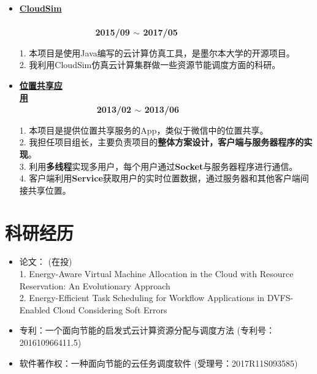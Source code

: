 \documentclass[letterpaper, UTF8, 11pt]{article}
\begin{document}
\begin{itemize}
		
		\item \textbf{\href{https://github.com/Hepsilion/cloudsim}{CloudSim}}  ~~~~~~~~~~~~~~~~~~~~~~~~~~~~~~~~~~~~~~~~~~~~~~~~~~~~~~~~~~~~~~~~~~~~~~~~~~~~~~~~~~~~~ \textbf{2015/09 $\sim$ 2017/05}
		
		1. 本项目是使用Java编写的云计算仿真工具，是墨尔本大学的开源项目。\\
		2. 我利用CloudSim仿真云计算集群做一些资源节能调度方面的科研。
		\vspace{0.01in}	
		
		\item \textbf{\href{https://github.com/Hepsilion/MapProject}{位置共享应用}}~~~~~~~~~~~~~~~~~~~~~~~~~~~~~~~~~~~~~~~~~~~~~~~~~~~~~~~~~~~~~~~~~~~~~~~~~~~~~~~~~~~~\textbf{2013/02 $\sim$ 2013/06}
		
		1. 本项目是提供位置共享服务的App，类似于微信中的位置共享。\\
		2. 我担任项目组长，主要负责项目的\textbf{整体方案设计，客户端与服务器程序的实现}。\\
		3. 利用\textbf{多线程}实现多用户，每个用户通过\textbf{Socket}与服务器程序进行通信。\\
		4. 客户端利用\textbf{Service}获取用户的实时位置数据，通过服务器和其他客户端间接共享位置。
		\vspace{0.01in}	
	\end{itemize}
	\vspace{-0.3in}
	
	\section*{\textbf{科研经历}}\vspace{-0.15in}
	\begin{itemize}	
		\item \small 论文： (在投)\\
		1. Energy-Aware Virtual Machine Allocation in the Cloud with Resource Reservation: An Evolutionary Approach\\
		2. Energy-Efficient Task Scheduling for Workflow Applications in DVFS-Enabled Cloud Considering Soft Errors
		\item 专利：一个面向节能的启发式云计算资源分配与调度方法 (专利号：201610966411.5)
		\item 软件著作权：一种面向节能的云任务调度软件 (受理号：2017R11S093585)
	\end{itemize}
	\vspace{-0.3in}
	
\end{document}
